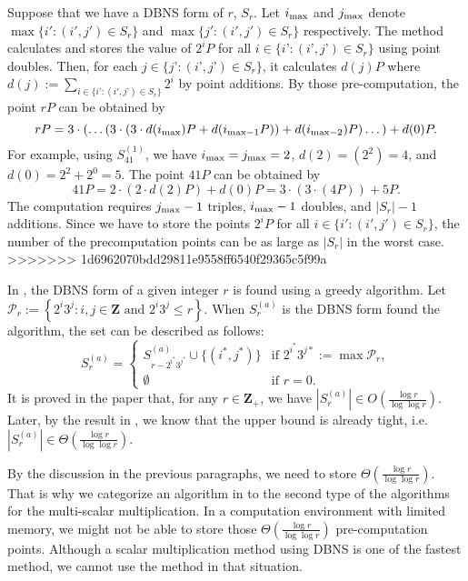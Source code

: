 Suppose that we have a DBNS form of $r$, $S_r$. Let $i_{\rm max}$ and $j_{\rm max}$ denote $\max\{ i' : (i',j') \in S_r \}$ and $\max\{ j' : (i',j') \in S_r \}$ respectively. The method calculates and stores the value of $2^iP$ for all $i \in \{i’ : (i’, j’) \in S_r \}$ using point doubles. Then, for each $j \in \{j’ : (i’, j’) \in S_r \}$, it calculates $d(j)P$ where $d(j) := \sum\limits_{i \in \{i’ : (i',j’) \in S_r\}} 2^i $ by point additions. By those pre-computation, the point $rP$ can be obtained by
$$rP = 3\cdot \left( \dots \left( 3 \cdot \left( 3 \cdot d(i_{\rm max})P + d(i_{\mathrm{max} - 1}P) \right) + d(i_{\mathrm{max} - 2})P \right) \dots \right) + d(0)P.$$
For example, using $S_{41}^{(1)}$, we have $i_{\rm max} = j_{\rm max} = 2$, $d(2) = \left(2^2\right) = 4$, and $d(0) =  2^2 + 2^0 = 5$. The point $41P$ can be obtained by
$$41P = 2 \cdot \left( 2 \cdot d(2)P  \right) + d(0)P = 3 \cdot \left( 3 \cdot \left( 4P \right)  \right) + 5P.$$
The computation requires $j_{\rm max} - 1$ triples, $i_{\rm max} - 1$ doubles, and $|S_r| - 1$ additions. Since we have to store the points $2^iP$ for all $i \in \{i' : (i',j') \in S_r\}$, the number of the precomputation points can be as large as $|S_r|$ in the worst case.
>>>>>>> 1d6962070bdd29811e9558ff6540f29365c5f99a

In \cite{dbns2}, the DBNS form of a given integer $r$ is found using a greedy algorithm. Let $\mathcal{P}_r := \left\{ 2^i3^j : i,j \in \mathbf{Z} \text{ and } 2^i3^j \leq r \right\}$. When $S^{(a)}_r$ is the DBNS form found the algorithm, the set can be described as follows:
\[
S^{(a)}_r =
\begin{cases}
S^{(a)}_{r - 2^{i^*}3^{j^*}} \cup \{(i^*, j^*)\} & \text{if } 2^{i^*}3^{j*} := \max \mathcal{P}_r, \\
\emptyset       & \text{if } r = 0.
\end{cases}
\]
It is proved in the paper that, for any $r \in \mathbf{Z}_+$, we have $\left|S_r^{(a)}\right| \in O(\frac{\log r}{\log \log r})$. Later, by the result in \cite{dbns3}, we know that the upper bound is already tight, i.e. $\left|S_r^{(a)}\right| \in \Theta(\frac{\log r}{\log \log r})$.

By the discussion in the previous paragraphs, we need to store $\Theta(\frac{\log r}{\log \log r})$. That is why we categorize an algorithm in \cite{dbns} to the second type of the algorithms for the multi-scalar multiplication. In a computation environment with limited memory, we might not be able to store those $\Theta(\frac{\log r}{\log \log r})$ pre-computation points. Although a scalar multiplication method using DBNS is one of the fastest method, we cannot use the method in that situation.

